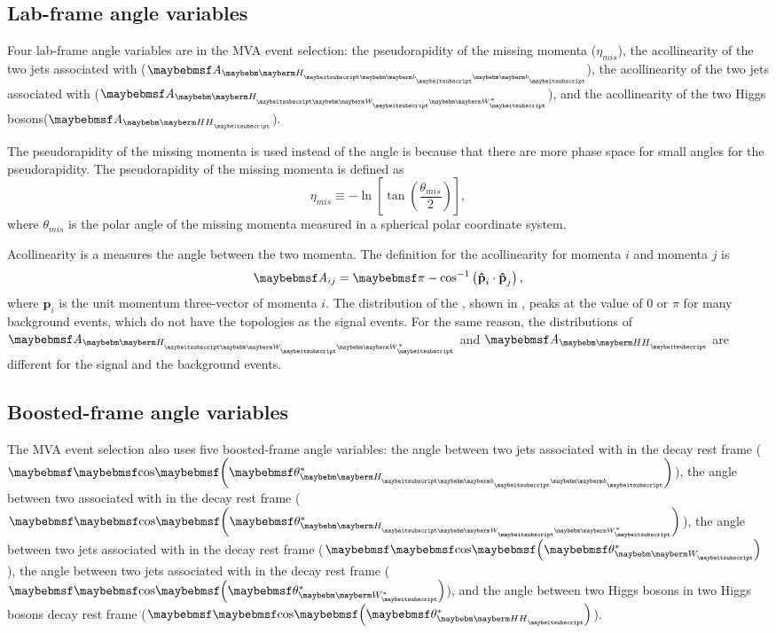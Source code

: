 \subsection{Lab-frame angle variables}

Four lab-frame angle variables are in the MVA event selection: the pseudorapidity of the missing momenta ($\eta_{mis}$), the  acollinearity of the two jets associated with \Hbb ($\acolinearity{\Hbb}$),  the  acollinearity of the two jets associated with \HWW ($\acolinearity{\HWW}$), and the  acollinearity of the two Higgs bosons($\acolinearity{\HH}$).

The pseudorapidity   of the missing momenta is used instead of the angle is because that there are more phase space for small angles for the pseudorapidity. The pseudorapidity of the missing momenta is defined as
\begin{equation}
\eta_{mis} \equiv  - \ln \left[ \tan \left( \frac{\theta_{mis}}{2} \right) \right],
\end{equation}
where $\theta_{mis}$ is the polar angle of the missing momenta measured in a spherical polar coordinate system.

Acollinearity is a measures the angle between the two momenta. The definition for the acollinearity for momenta $i$ and momenta $j$ is
\begin{equation}
\acolinearity{ij} = \pi - \cos^{-1}\left(\textbf{\^{p}}_i\cdot\textbf{\^{p}}_j\right),
\end{equation}
where $\textbf{\^{p}}_i$ is the unit momentum three-vector of momenta $i$. The distribution of the \acolinearity{\Hbb}, shown in , peaks at the value of 0 or $\pi$ for many background events, which do not have the topologies as the signal events. For the same reason, the distributions of $\acolinearity{\HWW}$ and $\acolinearity{\HH}$ are different for the signal and the background events.

\subsection{Boosted-frame angle variables}

The MVA event selection also uses five boosted-frame angle variables: the angle between two jets associated with \Hbb in the \Hbb decay rest frame ($\cosStar{\Hbb}$), the angle between two \PW associated with \HWW in the \HWW decay rest frame ($\cosStar{\HWW}$), the angle between two jets associated with \PW in the \PW decay rest frame ($\cosStar{\PW}$), the angle between two jets associated with \W* in the \W* decay rest frame ($\cosStar{\W*}$), and the angle between two Higgs bosons in two Higgs bosons decay rest frame ($\cosStar{\HH}$).

